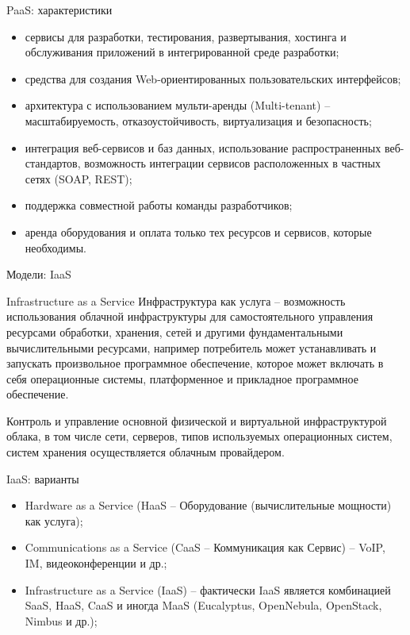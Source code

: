\begin{frame}{PaaS: характеристики}
	\begin{itemize}
		\item сервисы для разработки, тестирования, развертывания, хостинга и обслуживания приложений в интегрированной среде разработки;
		\item средства для создания Web-ориентированных пользовательских интерфейсов;
		\item архитектура с использованием мульти-аренды (Multi-tenant) -- масштабируемость,  отказоустойчивость,  виртуализация и безопасность;
		\item интеграция веб-сервисов и баз данных,  использование распространенных веб-стандартов,  возможность интеграции сервисов расположенных в частных сетях (SOAP, REST); 
		\item поддержка совместной работы команды разработчиков;
		\item аренда оборудования и оплата только тех ресурсов и сервисов,  которые необходимы.
	\end{itemize}
\end{frame}

\begin{frame}{Модели: IaaS}
	\begin{block}{Infrastructure as a Service}
Инфраструктура как услуга -- возможность использования облачной инфраструктуры для самостоятельного управления ресурсами обработки,  хранения,  сетей и другими фундаментальными вычислительными ресурсами,  например потребитель может устанавливать и запускать произвольное программное обеспечение,  которое может включать в себя операционные системы,  платформенное и прикладное программное обеспечение.

		\bigskip
		Контроль и управление основной физической и виртуальной инфраструктурой облака,  в том числе сети,  серверов,  типов используемых операционных систем,  систем хранения осуществляется облачным провайдером.
	\end{block}
\end{frame}


\begin{frame}{IaaS: варианты}

	\begin{itemize}
		\item Hardware as a Service (HaaS -- Оборудование (вычислительные мощности) как услуга);
		\item Communications as a Service (CaaS -- Коммуникация как Сервис) -- VoIP, IM, видеоконференции и др.;
		\item Infrastructure as a Service (IaaS) -- фактически IaaS является комбинацией SaaS,  HaaS, CaaS и иногда MaaS (Eucalyptus, OpenNebula, OpenStack, Nimbus и др.);

	\end{itemize}
\end{frame}


